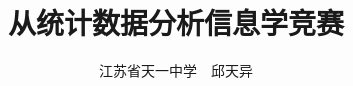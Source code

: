 \documentclass[12pt]{ctexart}
\title{从统计数据分析信息学竞赛}
\author{江苏省天一中学~~邱天异}
\begin{document}
\theoremstyle{plain}
\newtheorem{theorem}{\hspace{2em}定理}[section]
\newtheorem{corollary}{\hspace{2em}推论}[theorem]
\newtheorem{lemma}[theorem]{\hspace{2em}引理}
\newtheorem{proposition}[theorem]{\hspace{2em}命题}
\theoremstyle{definition}
\newtheorem{definition}[theorem]{\hspace{2em}定义}
\newtheorem{assumption}[theorem]{\hspace{2em}假设}

\maketitle


\end{document}
